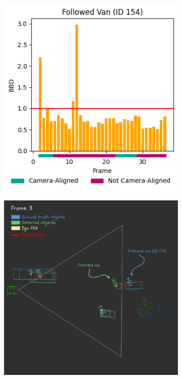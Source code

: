 \begin{figure}[h!]
    \centering
    \begin{subfigure}[b]{0.32\textwidth}
        \includegraphics[width=\linewidth]{images/experiments/bbd_followed_van.png}
        \caption{}
        \label{fig:van_bbd_through_frames_a}
    \end{subfigure}
    \hfill
    \begin{subfigure}[b]{0.32\textwidth}
        \includegraphics[width=\textwidth]{images/experiments/evaluation_frames/3d_evaluation_frame_3_canva.png}

\end{subfigure}
\end{figure}

